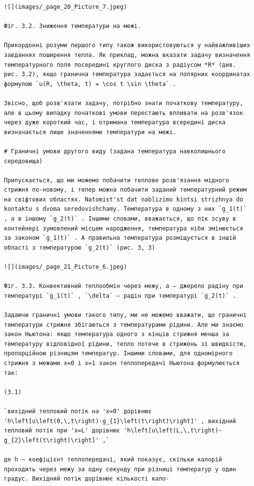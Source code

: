 \documentclass[
  ukrainian,
]{article}
\begin{document}
\begin{verbatim}
![](images/_page_20_Picture_7.jpeg)

Фіг. 3.2. Зниження температури на межі.

Прикордонні розуми першого типу також використовуються у найважливіших завданнях поширення тепла. Як приклад, можна вказати задачу визначення температурного поля посередині круглого диска з радіусом *R* (див. рис. 3.2), якщо гранична температура задається на полярних координатах формулою `u(R, \theta, t) = \cos t \sin \theta` .

Звісно, щоб розв'язати задачу, потрібно знати початкову температуру, але в цьому випадку початкові умови перестають впливати на розв'язок через дуже короткий час, і отримана температура всередині диска визначається лише значеннями температури на межі.

# Граничні умови другого виду (задана температура навколишнього середовища)

Припускається, що ми можемо побачити теплове розв'язання мідного стрижня по-новому, і тепер можна побачити заданий температурний режим на свіфтових областях. Natomist'st dat nablizimo kintsi strizhnya do kontaktu s dvoma seredovishchamy. Температура в одному з них `g_1(t)` , а в іншому `g_2(t)` . Іншими словами, вважається, що пік зсуву в контейнері зумовлений місцем народження, температура ніби змінюється за законом `g_1(t)` . А правильна температура розміщується в іншій області з температурою `g_2(t)` (рис. 3, 3)

![](images/_page_21_Picture_6.jpeg)

Фіг. 3.3. Конвективний теплообмін через межу, a — джерело радіну при температурі `g_1(t)` , `\delta` — радін при температурі `g_2(t)` .

Задаючи граничні умови такого типу, ми не можемо вважати, що граничні температури стрижня збігаються з температурами рідини. Але ми знаємо закон Ньютона: якщо температура одного з кінців стрижня менша за температуру відповідної рідини, тепло потече в стрижень зі швидкістю, пропорційною різницям температур. Іншими словами, для одномірного стрижня з межами x=0 і x=1 закон теплопередачі Ньютона формулюється так:

(3.1)

`вихідний тепловий потік на 'x=0' дорівнює 'h\left[u\left(0,\,t\right)-g_{1}\left(t\right)\right]' , вихідний тепловий потік при 'x=L' дорівнює 'h\left[u\left(L,\,t\right)-g_{2}\left(t\right)\right]' ,`

де h — коефіцієнт теплопередачі, який показує, скільки калорій проходить через межу за одну секунду при різниці температур у один градус. Вихідний потік дорівнює кількості кало-


\end{verbatim}
\end{document}
